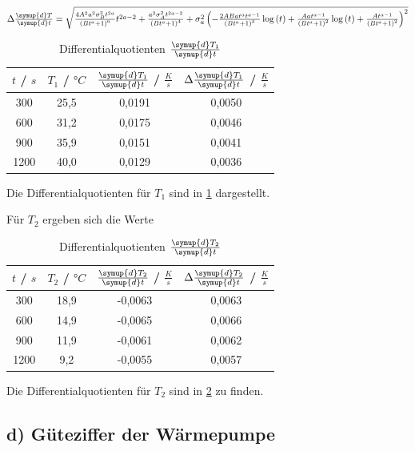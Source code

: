 $\Delta \frac{\symup{d}T}{\symup{d}t} = \sqrt{\frac{4 A^{2} a^{2} \sigma_{B}^{2} t^{2 a}}{\left(B t^{a} + 1\right)^{6}} t^{2 a - 2} + \frac{a^{2} \sigma_{A}^{2} t^{2 a - 2}}{\left(B t^{a} + 1\right)^{4}} + \sigma_{a}^{2} \left(- \frac{2 A B a t^{a} t^{a - 1}}{\left(B t^{a} + 1\right)^{3}} \log{\left (t \right )} + \frac{A a t^{a - 1}}{\left(B t^{a} + 1\right)^{2}} \log{\left (t \right )} + \frac{A t^{a - 1}}{\left(B t^{a} + 1\right)^{2}}\right)^{2}}$

\begin{table}
	\centering
	\caption{Differentialquotienten $\frac{\symup{d}T_1}{\symup{d}t}$ }
	\label{tab:diffT1}
\begin{tabular}{cccc}
	\toprule
	$t$ / $s$ & $T_1$ / $°C$ & $\frac{\symup{d}T_1}{\symup{d}t}$ / $\frac{K}{s}$ & $\Delta \frac{\symup{d}T_1}{\symup{d}t}$  / $\frac{K}{s}$ \\
	\midrule
	300 & 25,5 & 0,0191 & 0,0050 \\
	600 & 31,2 & 0,0175 & 0,0046 \\
	900 & 35,9 & 0,0151 & 0,0041 \\
	1200 & 40,0 & 0,0129 & 0,0036 \\
	\bottomrule
\end{tabular}
\end{table}

Die Differentialquotienten für  $T_1$ sind in \ref{tab:diffT1} dargestellt.

Für $T_2$ ergeben sich die Werte
\begin{table}
	\centering
	\caption{Differentialquotienten $\frac{\symup{d}T_2}{\symup{d}t}$}
	\label{tab:diffT2}
\begin{tabular}{cccc}
	\toprule
	$t$ / $s$ & $T_2$ / $°C$ & $\frac{\symup{d}T_2}{\symup{d}t}$ / $\frac{K}{s}$ & $\Delta \frac{\symup{d}T_2}{\symup{d}t}$  / $\frac{K}{s}$ \\
	\midrule
	300 & 18,9 & -0,0063 & 0,0063 \\
	600 & 14,9 & -0,0065 & 0,0066 \\
	900 & 11,9 & -0,0061 & 0,0062 \\
	1200 & 9,2 & -0,0055 & 0,0057 \\
	\bottomrule
\end{tabular}
\end{table}

Die Differentialquotienten für $T_2$ sind in \ref{tab:diffT2} zu finden.

\newpage


\subsection{d) Güteziffer der Wärmepumpe}


